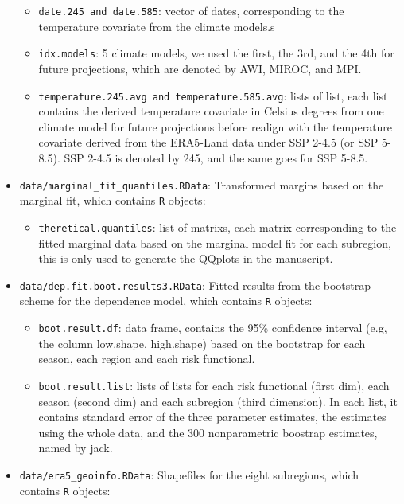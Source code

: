 \documentclass[
]{article}
\providecommand{\tightlist}{%
  \setlength{\itemsep}{0pt}\setlength{\parskip}{0pt}}
\begin{document}
\begin{itemize}
  \begin{itemize}
  \tightlist
  \item
    \texttt{date.245\ and\ date.585}: vector of dates, corresponding to
    the temperature covariate from the climate models.s
  \item
    \texttt{idx.models}: 5 climate models, we used the first, the 3rd,
    and the 4th for future projections, which are denoted by AWI, MIROC,
    and MPI.
  \item
    \texttt{temperature.245.avg\ and\ temperature.585.avg}: lists of
    list, each list contains the derived temperature covariate in
    Celsius degrees from one climate model for future projections before
    realign with the temperature covariate derived from the ERA5-Land
    data under SSP 2-4.5 (or SSP 5-8.5). SSP 2-4.5 is denoted by 245,
    and the same goes for SSP 5-8.5.\\
  \end{itemize}
\item
  \texttt{data/marginal\_fit\_quantiles.RData}: Transformed margins
  based on the marginal fit, which contains \texttt{R} objects:

  \begin{itemize}
  \tightlist
  \item
    \texttt{theretical.quantiles}: list of matrixs, each matrix
    corresponding to the fitted marginal data based on the marginal
    model fit for each subregion, this is only used to generate the
    QQplots in the manuscript.
  \end{itemize}
\item
  \texttt{data/dep.fit.boot.results3.RData}: Fitted results from the
  bootstrap scheme for the dependence model, which contains \texttt{R}
  objects:

  \begin{itemize}
  \tightlist
  \item
    \texttt{boot.result.df}: data frame, contains the 95\% confidence
    interval (e.g, the column low.shape, high.shape) based on the
    bootstrap for each season, each region and each risk functional.
  \item
    \texttt{boot.result.list}: lists of lists for each risk functional
    (first dim), each season (second dim) and each subregion (third
    dimension). In each list, it contains standard error of the three
    parameter estimates, the estimates using the whole data, and the 300
    nonparametric boostrap estimates, named by jack.\\
  \end{itemize}
\item
  \texttt{data/era5\_geoinfo.RData}: Shapefiles for the eight
  subregions, which contains \texttt{R} objects:


\end{itemize}
\end{document}
